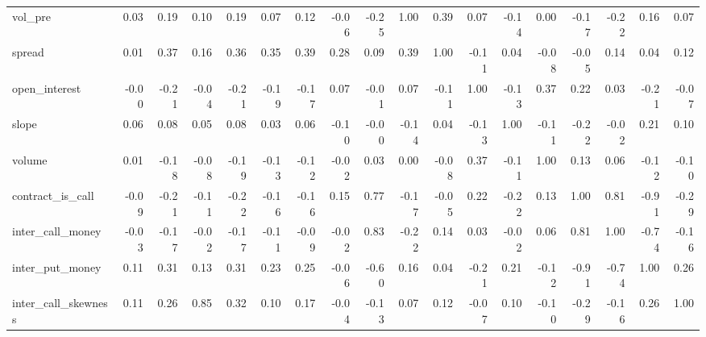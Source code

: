 \begin{tabular}{lrrrrrrrrrrrrrrrrr}
vol\_pre             &     0.03 &        0.19 &      0.10 &    0.19 &          0.07 &        0.12 & -0.06 &    -0.25 &     1.00 &    0.39 &           0.07 &  -0.14 &    0.00 &             -0.17 &             -0.22 &             0.16 &                 0.07 \\
spread              &     0.01 &        0.37 &      0.16 &    0.36 &          0.35 &        0.39 &  0.28 &     0.09 &     0.39 &    1.00 &          -0.11 &   0.04 &   -0.08 &             -0.05 &              0.14 &             0.04 &                 0.12 \\
open\_interest       &    -0.00 &       -0.21 &     -0.04 &   -0.21 &         -0.19 &       -0.17 &  0.07 &    -0.01 &     0.07 &   -0.11 &           1.00 &  -0.13 &    0.37 &              0.22 &              0.03 &            -0.21 &                -0.07 \\
slope               &     0.06 &        0.08 &      0.05 &    0.08 &          0.03 &        0.06 & -0.10 &    -0.00 &    -0.14 &    0.04 &          -0.13 &   1.00 &   -0.11 &             -0.22 &             -0.02 &             0.21 &                 0.10 \\
volume              &     0.01 &       -0.18 &     -0.08 &   -0.19 &         -0.13 &       -0.12 & -0.02 &     0.03 &     0.00 &   -0.08 &           0.37 &  -0.11 &    1.00 &              0.13 &              0.06 &            -0.12 &                -0.10 \\
contract\_is\_call    &    -0.09 &       -0.21 &     -0.11 &   -0.22 &         -0.16 &       -0.16 &  0.15 &     0.77 &    -0.17 &   -0.05 &           0.22 &  -0.22 &    0.13 &              1.00 &              0.81 &            -0.91 &                -0.29 \\
inter\_call\_money    &    -0.03 &       -0.17 &     -0.02 &   -0.17 &         -0.11 &       -0.09 & -0.02 &     0.83 &    -0.22 &    0.14 &           0.03 &  -0.02 &    0.06 &              0.81 &              1.00 &            -0.74 &                -0.16 \\
inter\_put\_money     &     0.11 &        0.31 &      0.13 &    0.31 &          0.23 &        0.25 & -0.06 &    -0.60 &     0.16 &    0.04 &          -0.21 &   0.21 &   -0.12 &             -0.91 &             -0.74 &             1.00 &                 0.26 \\
inter\_call\_skewness &     0.11 &        0.26 &      0.85 &    0.32 &          0.10 &        0.17 & -0.04 &    -0.13 &     0.07 &    0.12 &          -0.07 &   0.10 &   -0.10 &             -0.29 &             -0.16 &             0.26 &                 1.00 \\
\bottomrule
\end{tabular}
